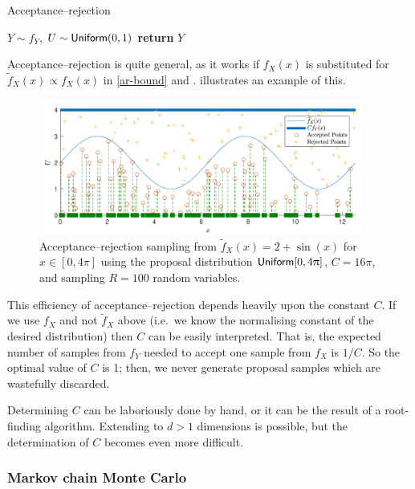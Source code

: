 \begin{algorithm}[H]
\caption{Acceptance--rejection}
\label{alg:ar}
\begin{algorithmic}[1]
\State $Y \sim f_Y$, $U \sim \mathsf{Uniform}(0,1)$
\State \textbf{return} $Y$
\EndIf
\EndWhile
\EndFunction
\end{algorithmic}
\end{algorithm}

Acceptance--rejection is quite general, as it works if $f_X(x)$ is substituted for $\tilde{f}_X(x) \propto f_X(x)$ in \eqref{ar-bound} and .  illustrates an example of this.

\begin{figure}[H]
\centering
\includegraphics[width=0.95\textwidth]{images/ar.pdf}
\caption{Acceptance--rejection sampling from $\tilde{f}_X(x) = 2 + \sin(x)$ for $x \in [0, 4\pi]$ using the proposal distribution $\mathsf{Uniform}[0,4\uppi]$, $C=16\pi$, and sampling $R=100$ random variables.}
\label{fig:ar}
\end{figure}

This efficiency of acceptance--rejection depends heavily upon the constant $C$. If we use $f_X$ and not $\tilde{f}_X$ above (i.e.\ we know the normalising constant of the desired distribution) then $C$ can be easily interpreted. That is, the expected number of samples from $f_Y$ needed to accept one sample from $f_X$ is $1 / C$. So the optimal value of $C$ is 1; then, we never generate proposal samples which are wastefully discarded.

Determining $C$ can be laboriously done by hand, or it can be the result of a root-finding algorithm. Extending to $d>1$ dimensions is possible, but the determination of $C$ becomes even more difficult.

\subsubsection{Markov chain Monte Carlo}

